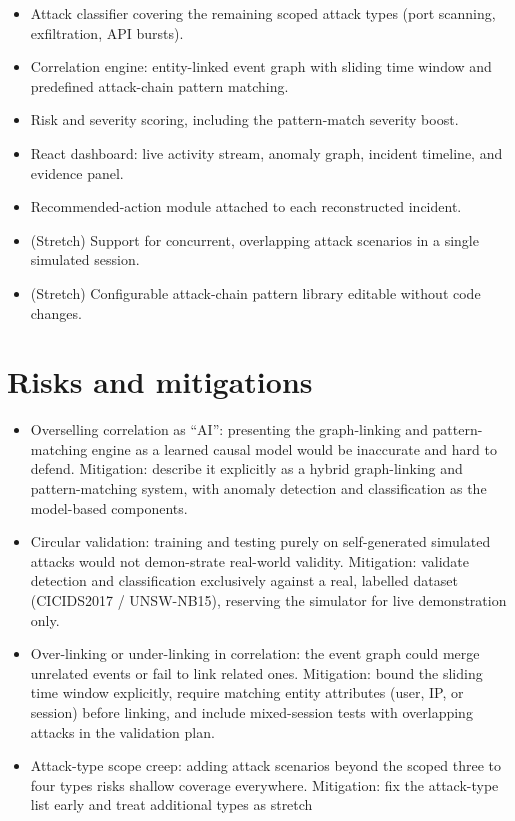 \documentclass[12pt]{article}
\begin{document}
\begin{itemize}
  \item Attack classifier covering the remaining scoped attack types (port scanning, exfiltration, API bursts).
  \item Correlation engine: entity-linked event graph with sliding time window and predefined attack-chain pattern matching.
  \item Risk and severity scoring, including the pattern-match severity boost.
  \item React dashboard: live activity stream, anomaly graph, incident timeline, and evidence panel.
  \item Recommended-action module attached to each reconstructed incident.
  \item (Stretch) Support for concurrent, overlapping attack scenarios in a single simulated session.
  \item (Stretch) Configurable attack-chain pattern library editable without code changes.
\end{itemize}

\section{Risks and mitigations}

\begin{itemize}
  \item Overselling correlation as ``AI'': presenting the graph-linking and pattern-matching engine as a learned causal model would be inaccurate and hard to defend. Mitigation: describe it explicitly as a hybrid graph-linking and pattern-matching system, with anomaly detection and classification as the model-based components.
  \item Circular validation: training and testing purely on self-generated simulated attacks would not demon-strate real-world validity. Mitigation: validate detection and classification exclusively against a real, labelled dataset (CICIDS2017 / UNSW-NB15), reserving the simulator for live demonstration only.
  \item Over-linking or under-linking in correlation: the event graph could merge unrelated events or fail to link related ones. Mitigation: bound the sliding time window explicitly, require matching entity attributes (user, IP, or session) before linking, and include mixed-session tests with overlapping attacks in the validation plan.
  \item Attack-type scope creep: adding attack scenarios beyond the scoped three to four types risks shallow coverage everywhere. Mitigation: fix the attack-type list early and treat additional types as stretch
\end{itemize}
\end{document}

